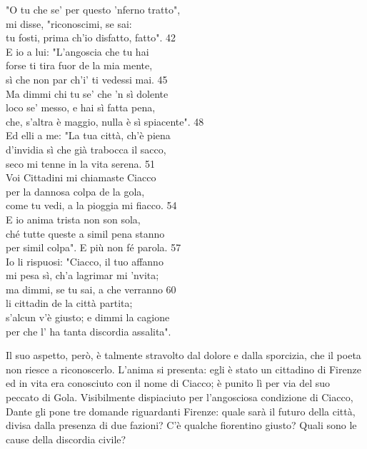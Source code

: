 \documentclass[10pt,a4paper]{article}
\begin{document}
	\begin{estratto}
		"O tu che se’ per questo ’nferno tratto",\\
		mi disse, "riconoscimi, se sai:\\
		tu fosti, prima ch’io disfatto, fatto".		42\\
		
		E io a lui: "L’angoscia che tu hai\\
		forse ti tira fuor de la mia mente,\\
		sì che non par ch’i’ ti vedessi mai.		45\\
		
		Ma dimmi chi tu se’ che ’n sì dolente\\
		loco se’ messo, e hai sì fatta pena,\\
		che, s’altra è maggio, nulla è sì spiacente".		48\\
		
		Ed elli a me: "La tua città, ch’è piena\\
		d’invidia sì che già trabocca il sacco,\\
		seco mi tenne in la vita serena.		51\\
		
		Voi Cittadini mi chiamaste Ciacco\\
		per la dannosa colpa de la gola,\\
		come tu vedi, a la pioggia mi fiacco.		54\\
		
		E io anima trista non son sola,\\
		ché tutte queste a simil pena stanno\\
		per simil colpa". E più non fé parola.		57\\
		
		Io li rispuosi: "Ciacco, il tuo affanno\\
		mi pesa sì, ch’a lagrimar mi ’nvita;\\
		ma dimmi, se tu sai, a che verranno		60\\
		
		li cittadin de la città partita;\\
		s’alcun v’è giusto; e dimmi la cagione\\
		per che l’ ha tanta discordia assalita".\\
	\end{estratto}
	
	Il suo aspetto, però, è talmente stravolto dal dolore e dalla sporcizia, che il poeta non riesce a riconoscerlo. L’anima si presenta: egli è stato un cittadino di Firenze ed in vita era conosciuto con il nome di Ciacco; è punito lì per via del suo peccato di Gola. Visibilmente dispiaciuto per l’angosciosa condizione di Ciacco, Dante gli pone tre domande riguardanti Firenze: quale sarà il futuro della città, divisa dalla presenza di due fazioni? C’è qualche fiorentino giusto? Quali sono le cause della discordia civile?
	
\end{document}
